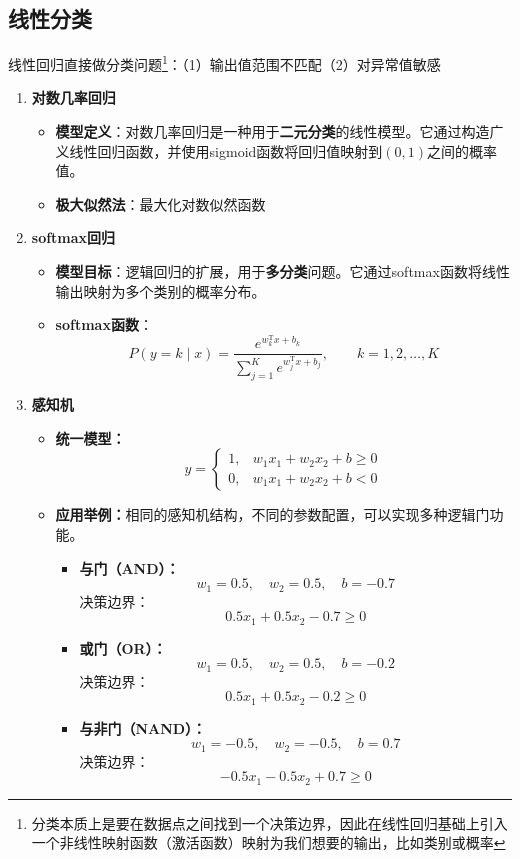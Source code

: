 \documentclass[../main.tex]{subfiles}
\begin{document}
\subsection{线性分类}\label{sec:linear-classification}
线性回归直接做分类问题\footnote{分类本质上是要在数据点之间找到一个决策边界，因此在线性回归基础上引入一个非线性映射函数（激活函数）映射为我们想要的输出，比如类别或概率}：（1）输出值范围不匹配（2）对异常值敏感
\begin{enumerate}
    \item \textbf{对数几率回归}
    \begin{itemize}
        \item \textbf{模型定义}：对数几率回归是一种用于\textbf{二元分类}的线性模型。它通过构造广义线性回归函数，并使用sigmoid函数将回归值映射到$(0,1)$之间的概率值。
        \item \textbf{极大似然法}：最大化对数似然函数
    \end{itemize}
    
    \item \textbf{softmax回归}
    \begin{itemize}
        \item \textbf{模型目标}：逻辑回归的扩展，用于\textbf{多分类}问题。它通过softmax函数将线性输出映射为多个类别的概率分布。
        \item \textbf{softmax函数}：
        $$
        P(y=k\mid x)=\frac{e^{w_k^{\mathrm T}x+b_k}}{\sum_{j=1}^{K}e^{w_j^{\mathrm T}x+b_j}},\qquad k=1,2,\dots,K
        $$
    \end{itemize}    
    
    \item \textbf{感知机}
    \begin{itemize}
        \item \textbf{统一模型：}
        $$
        y=
        \begin{cases}
        1, & w_1x_1+w_2x_2+b\ge 0 \\
        0, & w_1x_1+w_2x_2+b<0
        \end{cases}
        $$
        \item \textbf{应用举例：}相同的感知机结构，不同的参数配置，可以实现多种逻辑门功能。
        {\small\kaishu
        \begin{itemize}
            \item \textbf{与门（AND）：}
            $$
            w_1=0.5,\quad w_2=0.5,\quad b=-0.7
            $$
            决策边界：
            $$
            0.5x_1+0.5x_2-0.7\ge 0
            $$
            
            \item \textbf{或门（OR）：}
            $$
            w_1=0.5,\quad w_2=0.5,\quad b=-0.2
            $$
            决策边界：
            $$
            0.5x_1+0.5x_2-0.2\ge 0
            $$
            
            \item \textbf{与非门（NAND）：}
            $$
            w_1=-0.5,\quad w_2=-0.5,\quad b=0.7
            $$
            决策边界：
            $$
            -0.5x_1-0.5x_2+0.7\ge 0
            $$
        \end{itemize}
        }
    \end{itemize}
\end{enumerate}
\end{document}
